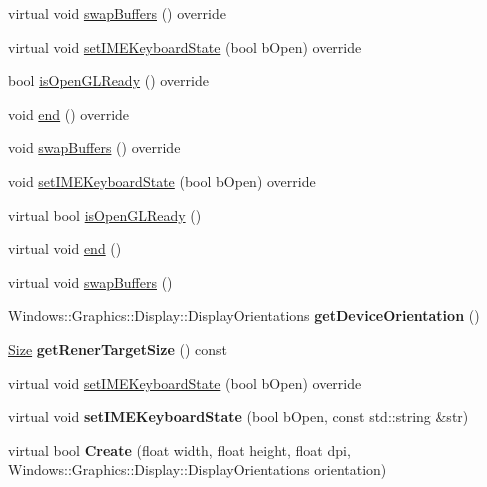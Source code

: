 \begin{DoxyCompactItemize}
virtual void \hyperlink{classGLViewImpl_ab434675d26eb367ae74f9533c34d2ca7}{swap\+Buffers} () override
\item 
virtual void \hyperlink{classGLViewImpl_a37e04acaf52f6258ebe98d6b36c3b6c3}{set\+I\+M\+E\+Keyboard\+State} (bool b\+Open) override
\item 
bool \hyperlink{classGLViewImpl_a037047e04b2070c1c6d874756a978a02}{is\+Open\+G\+L\+Ready} () override
\item 
void \hyperlink{classGLViewImpl_ab2d87c9a94b84691ed9ae4ca378745a8}{end} () override
\item 
void \hyperlink{classGLViewImpl_a29bbe397ac0cd3793fa0815b34cd37aa}{swap\+Buffers} () override
\item 
void \hyperlink{classGLViewImpl_a134389b64b11ebd0af740c9acba58dc9}{set\+I\+M\+E\+Keyboard\+State} (bool b\+Open) override
\item 
virtual bool \hyperlink{classGLViewImpl_a4fdf5280c768291ab6a46731639f8829}{is\+Open\+G\+L\+Ready} ()
\item 
virtual void \hyperlink{classGLViewImpl_a045b39ae9907d0c2d25d49a70e5ce9e4}{end} ()
\item 
virtual void \hyperlink{classGLViewImpl_afe7883d151fd7d92d19d3359dc33e8b9}{swap\+Buffers} ()
\item 
\mbox{\label{classGLViewImpl_aa882f89a4980178d2fb89b2aa60e6df4}} 
Windows\+::\+Graphics\+::\+Display\+::\+Display\+Orientations {\bfseries get\+Device\+Orientation} ()
\item 
\mbox{\label{classGLViewImpl_a11b373f475abc172963479ece4e96814}} 
\hyperlink{classSize}{Size} {\bfseries get\+Rener\+Target\+Size} () const
\item 
virtual void \hyperlink{classGLViewImpl_a37e04acaf52f6258ebe98d6b36c3b6c3}{set\+I\+M\+E\+Keyboard\+State} (bool b\+Open) override
\item 
\mbox{\label{classGLViewImpl_a43c63d18e362bdbd2488466932081df2}} 
virtual void {\bfseries set\+I\+M\+E\+Keyboard\+State} (bool b\+Open, const std\+::string \&str)
\item 
\mbox{\label{classGLViewImpl_a9e73cd8e1884f005917cdd744f85d6c1}} 
virtual bool {\bfseries Create} (float width, float height, float dpi, Windows\+::\+Graphics\+::\+Display\+::\+Display\+Orientations orientation)
\item 

\end{DoxyCompactItemize}
